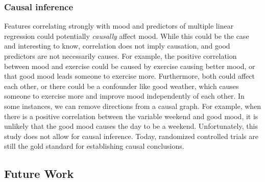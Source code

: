 \documentclass[conference]{IEEEtran}
\begin{document}
\subsubsection{Causal inference}
Features correlating strongly with mood and predictors of multiple linear regression could potentially \textit{causally} affect mood. While this could be the case and interesting to know, correlation does not imply causation, and good predictors are not necessarily causes.
For example, the positive correlation between mood and exercise could be caused by exercise causing better mood, or that good mood leads someone to exercise more. Furthermore, both could affect each other, or there could be a confounder like good weather, which causes someone to exercise more and improve mood independently of each other.
In some instances, we can remove directions from a causal graph.
For example, when there is a positive correlation between the variable weekend and good mood, it is unlikely that the good mood causes the day to be a weekend. Unfortunately, this study does not allow for causal inference. Today, randomized controlled trials are still the gold standard for establishing causal conclusions\cite{hariton_randomised_2018}. 



\subsection{Future Work}
\end{document}
